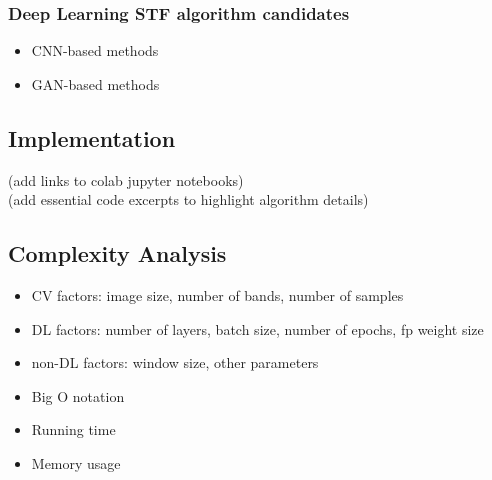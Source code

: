\begin{multicols}{2}
\subsubsection{Deep Learning STF algorithm candidates}
\begin{itemize}
    \item CNN-based methods
    \item GAN-based methods
\end{itemize}

\subsection{Implementation}
(add links to colab jupyter notebooks) \\
(add essential code excerpts to highlight algorithm details)

\subsection{Complexity Analysis}

\begin{itemize}
    \item CV factors: image size, number of bands, number of samples
    \item DL factors: number of layers, batch size, number of epochs, fp weight size
    \item non-DL factors: window size, other parameters 
    \item Big O notation
    \item Running time 
    \item Memory usage
\end{itemize}

\end{multicols}

\clearpage
